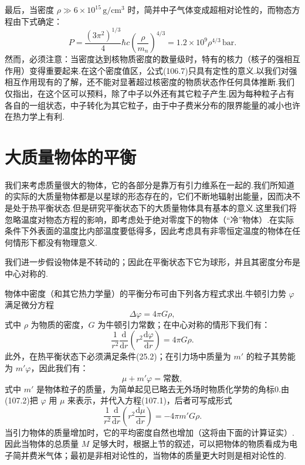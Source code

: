最后，当密度 $\rho\gg6\times10^{15}\,\mathrm{g/cm^3}$ 时，简并中子气体变成超相对论性的，而物态方程由下式确定：
\begin{equation}
  P=\frac{(3\pi^2)^{1/3}}{4}\hbar c\left(\frac{\rho}{m_n}\right)^{4/3}
  =1.2\times10^9\rho^{4/3}\,\mathrm{bar}.
\end{equation}
然而，必须注意：当密度达到核物质密度的数量级时，特有的核力（核子的强相互作用）变得重要起来.在这个密度值区，公式(106.7)只具有定性的意义.以我们对强相互作用现有的了解，还不能对显著超过核密度的物质状态作任何具体推断.我们仅指出，在这个区可以预料，除了中子以外还有其它粒子产生.因为每种粒子占有各自的一组状态，中子转化为其它粒子，由于中子费米分布的限界能量的减小也许在热力学上有利.

\section{大质量物体的平衡}

我们来考虑质量很大的物体，它的各部分是靠万有引力维系在一起的.我们所知道的实际的大质量物体都是以星球的形态存在的，它们不断地辐射出能量，因而决不是处于热平衡状态.但是研究平衡状态下的大质量物体具有基本的意义.这里我们将忽略温度对物态方程的影响，即考虑处于绝对零度下的物体（“冷”物体）.在实际条件下外表面的温度比内部温度要低得多，因此考虑具有非零恒定温度的物体在任何情形下都没有物理意义.

我们进一步假设物体是不转动的；因此在平衡状态下它为球形，并且其密度分布是中心对称的.

物体中密度（和其它热力学量）的平衡分布可由下列各方程式求出.牛顿引力势 $\varphi$ 满足微分方程
\begin{equation*}
  \Delta\varphi=4\pi G\rho,
\end{equation*}
式中 $\rho$ 为物质的密度，$G$ 为牛顿引力常数；在中心对称的情形下我们有：
\begin{equation}
  \frac{1}{r^2}\frac{\mathrm{d}}{\mathrm{d}r}
  \left(r^2\frac{\mathrm{d}\varphi}{\mathrm{d}r}\right)=4\pi G\rho.
\end{equation}
此外，在热平衡状态下必须满足条件(25.2)；在引力场中质量为 $m'$ 的粒子其势能为 $m'\varphi$，因此我们有：
\begin{equation}
  \mu+m'\varphi=\text{常数},
\end{equation}
式中 $m'$ 是物体粒子的质量，为简单起见已略去无外场时物质化学势的角标0.由(107.2)把 $\varphi$ 用 $\mu$ 来表示，并代入方程(107.1)，后者可写成形式
\begin{equation}
  \frac{1}{r^2}\frac{\mathrm{d}}{\mathrm{d}r}
  \left(r^2\frac{\mathrm{d}\mu}{\mathrm{d}r}\right)
  =-4\pi m'G\rho.
\end{equation}
当引力物体的质量增加时，它的平均密度自然也增加（这将由下面的计算证实）.因此当物体的总质量 $M$ 足够大时，根据上节的叙述，可以把物体的物质看成为电子简并费米气体；最初是非相对论性的，当物体的质量更大时则是相对论性的.

